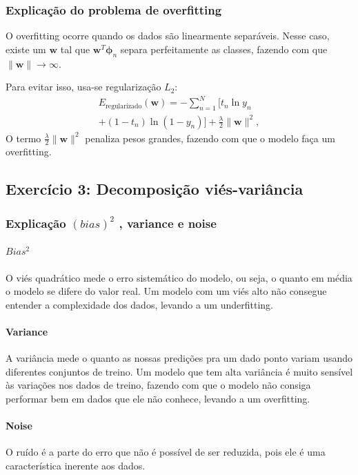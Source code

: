 \documentclass[conference]{IEEEtran}
\begin{document}
\subsubsection{Explicação do problema de overfitting}
O overfitting ocorre quando os dados são linearmente separáveis. Nesse caso, existe um $\mathbf{w}$ tal que $\mathbf{w}^T \boldsymbol{\phi}_n$ separa perfeitamente as classes, fazendo com que $\|\mathbf{w}\| \to \infty$.

Para evitar isso, usa-se regularização $L_2$:
\begin{multline*}
  E_{\text{regularizado}}(\mathbf{w})  = -\sum_{n=1}^{N} [ t_n \ln y_n \\
   + (1 - t_n) \ln(1 - y_n) ] + \frac{\lambda}{2} \|\mathbf{w}\|^2,
\end{multline*}
O termo $\frac{\lambda}{2} \|\mathbf{w}\|^2$ penaliza pesos grandes, fazendo com que o modelo faça um overfitting.

\subsection{Exercício 3: Decomposição viés-variância}
\label{subsec:ex3}
\subsubsection{Explicação $(bias) ^ 2$ , variance e noise}
\paragraph*{$Bias ^ 2$}
O viés quadrático mede o erro sistemático do modelo, ou seja, o quanto em média o modelo se difere do valor real. Um modelo com um viés alto não consegue entender a complexidade dos dados, levando a um underfitting.
\paragraph*{Variance}
A variância mede o quanto as nossas predições pra um dado ponto variam usando diferentes conjuntos de treino. Um modelo que tem alta variância é muito sensível às variações nos dados de treino, fazendo com que o modelo não consiga performar bem em dados que ele não conhece, levando a um overfitting.
\paragraph*{Noise}
O ruído é a parte do erro que não é possível de ser reduzida, pois ele é uma característica inerente aos dados.
\end{document}
